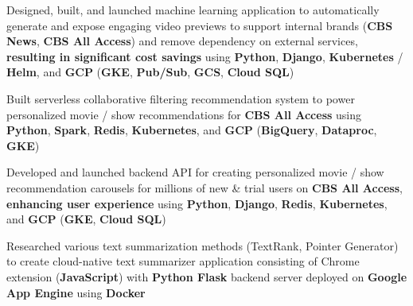 \begin{cventries}
{\begin{cvitems}
            \item {Designed, built, and launched machine learning application to automatically generate and expose engaging video previews to support internal brands (\textbf{CBS News}, \textbf{CBS All Access}) and remove dependency on external services, \textbf{resulting in significant cost savings} using \textbf{Python}, \textbf{Django}, \textbf{Kubernetes} / \textbf{Helm}, and \textbf{GCP} (\textbf{GKE}, \textbf{Pub/Sub}, \textbf{GCS}, \textbf{Cloud SQL})}
 		\item {Built serverless collaborative filtering recommendation system to power personalized movie / show recommendations for \textbf{CBS All Access} using \textbf{Python}, \textbf{Spark}, \textbf{Redis}, \textbf{Kubernetes}, and \textbf{GCP} (\textbf{BigQuery}, \textbf{Dataproc}, \textbf{GKE})}
        \item {Developed and launched backend API for creating personalized movie / show recommendation carousels for millions of new \& trial users on \textbf{CBS All Access}, \textbf{enhancing user experience} using \textbf{Python}, \textbf{Django}, \textbf{Redis}, \textbf{Kubernetes}, and \textbf{GCP} (\textbf{GKE}, \textbf{Cloud SQL})}
  		\item {Researched various text summarization methods (TextRank, Pointer Generator) to create cloud-native text summarizer application consisting of Chrome extension (\textbf{JavaScript}) with \textbf{Python Flask} backend server deployed on \textbf{Google App Engine} using \textbf{Docker}}

\end{cvitems}}
\end{cventries}

